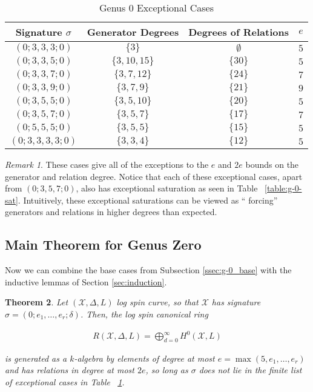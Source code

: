 \documentclass{amsart}
\theoremstyle{plain}
\newtheorem{thm}{Theorem}[section]
\theoremstyle{definition}
\theoremstyle{remark}
\newtheorem{rem}[thm]{Remark}
\numberwithin{equation}{section}
\newcommand\ssec{\subsection}
\newcommand\sx{\mathscr X}
\newcommand{\halfcan}{L}
\begin{document}
\begin{table}
\begin{tabular}
	{| c || c | c | c |}
	\hline
	Signature $\sigma$ & Generator Degrees & Degrees of Relations & $e$ \\
	\hline
	\hline

	$(0; 3, 3, 3; 0)$ & $\{3\}$ & $\emptyset$ & $5$ \\	\hline

	$(0; 3, 3, 5; 0)$ & $\{3, 10, 15\}$ & $\{30\}$ & $5$ \\	\hline
	
	$(0; 3, 3, 7; 0)$ & $\{3, 7, 12\}$ & $\{24\}$ & $7$ \\	\hline
	
	$(0; 3, 3, 9; 0)$ & $\{3, 7, 9\}$ & $\{21\}$ & $9$ \\	\hline
	
	$(0; 3, 5, 5; 0)$ & $\{3, 5, 10\}$ & $\{20\}$ & $5$ \\	\hline
	
	$(0; 3, 5, 7; 0)$ & $\{3, 5, 7\}$ & $\{17\}$ & $7$ \\	\hline
	
	$(0; 5, 5, 5; 0)$ & $\{3, 5, 5\}$ & $\{15\}$ & $5$ \\	\hline
	
	$(0; 3, 3, 3, 3; 0)$ & $\{3, 3, 4\}$ & $\{12\}$ & $5$ \\	\hline
\end{tabular}
	\caption{Genus 0 Exceptional Cases}
	\label{table:g-0-exceptional}
\end{table}

\begin{rem}
These cases give all of the exceptions to the $e$ and $2e$ bounds
on the generator and relation degree. Notice that each of these
exceptional cases, apart from $(0; 3, 5, 7; 0)$, also has
exceptional saturation as seen in Table ~\ref{table:g-0-sat}.
Intuitively, these exceptional saturations can be viewed as ``
forcing'' generators and relations in higher degrees than expected.
\end{rem}

\ssec{Main Theorem for Genus Zero}
\label{ssec:g-0-main}
Now we can combine the base cases from Subsection \ref{ssec:g-0_base} with the inductive lemmas of Section \ref{sec:induction}.

\begin{thm}
\label{thm:g-0-main}
Let $(\sx, \Delta, \halfcan)$ log spin curve,
so that $\sx$ has signature $\sigma = (0; e_1, \ldots, e_r; \delta)$.
Then, the log spin canonical ring

\begin{align*}
	R(\sx, \Delta, \halfcan) = \bigoplus_{d = 0}^\infty H^0(\sx, L)
\end{align*}

\noindent
is generated as a $k$-algebra by elements of degree at most $e =
\max(5, e_1, \ldots, e_r)$ and has relations in degree at most $2e$,
so long as $\sigma$ does not lie in the finite list of exceptional
cases in Table ~\ref{table:g-0-exceptional}.
\end{thm}
\end{document}
